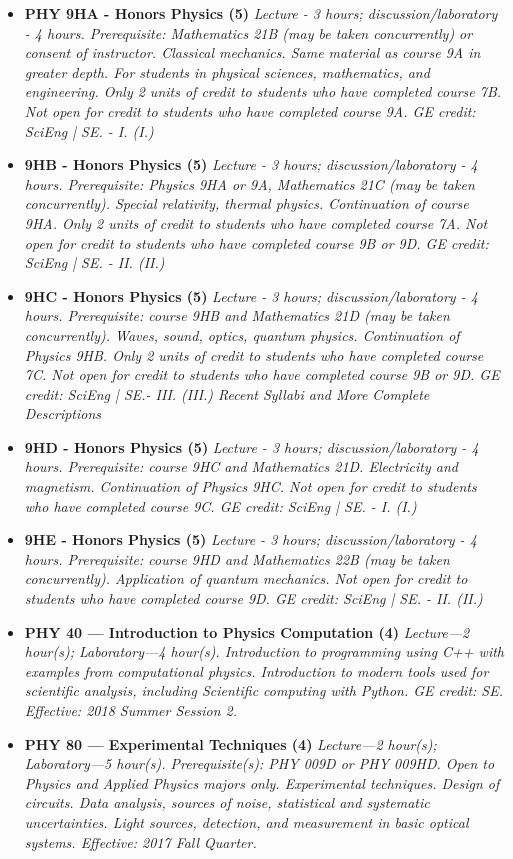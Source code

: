\documentclass[12pt]{article}
\begin{document}
\begin{itemize}
\item {\bf PHY 9HA - Honors Physics (5)}
{\it Lecture - 3 hours; discussion/laboratory - 4 hours. Prerequisite: Mathematics 21B (may be taken concurrently) or consent of instructor. Classical mechanics. Same material as course 9A in greater depth. For students in physical sciences, mathematics, and engineering. Only 2 units of credit to students who have completed course 7B. Not open for credit to students who have completed course 9A. GE credit: SciEng | SE. - I. (I.)}

\item {\bf 9HB - Honors Physics (5)}
{\it Lecture - 3 hours; discussion/laboratory - 4 hours. Prerequisite: Physics 9HA or 9A, Mathematics 21C (may be taken concurrently). Special relativity, thermal physics. Continuation of course 9HA. Only 2 units of credit to students who have completed course 7A. Not open for credit to students who have completed course 9B or 9D. GE credit: SciEng | SE. - II. (II.)}

\item {\bf 9HC - Honors Physics (5)}
{\it Lecture - 3 hours; discussion/laboratory - 4 hours. Prerequisite: course 9HB and Mathematics 21D (may be taken concurrently). Waves, sound, optics, quantum physics. Continuation of Physics 9HB. Only 2 units of credit to students who have completed course 7C. Not open for credit to students who have completed course 9B or 9D. GE credit: SciEng | SE.- III. (III.)
Recent Syllabi and More Complete Descriptions}

\item {\bf 9HD - Honors Physics (5)}
{\it Lecture - 3 hours; discussion/laboratory - 4 hours. Prerequisite: course 9HC and Mathematics 21D. Electricity and magnetism. Continuation of Physics 9HC. Not open for credit to students who have completed course 9C. GE credit: SciEng | SE. - I. (I.)}

\item {\bf 9HE - Honors Physics (5)}
{\it Lecture - 3 hours; discussion/laboratory - 4 hours. Prerequisite: course 9HD and Mathematics 22B (may be taken concurrently). Application of quantum mechanics. Not open for credit to students who have completed course 9D. GE credit: SciEng | SE. - II. (II.)}

\item {\bf PHY 40 — Introduction to Physics Computation (4)}
{\it Lecture—2 hour(s); Laboratory—4 hour(s). Introduction to programming using C++ with examples from computational physics. Introduction to modern tools used for scientific analysis, including Scientific computing with Python. GE credit: SE. Effective: 2018 Summer Session 2.}

\item {\bf PHY 80 — Experimental Techniques (4)}
{\it Lecture—2 hour(s); Laboratory—5 hour(s). Prerequisite(s): PHY 009D or PHY 009HD. Open to Physics and Applied Physics majors only. Experimental techniques. Design of circuits. Data analysis, sources of noise, statistical and systematic uncertainties. Light sources, detection, and measurement in basic optical systems. Effective: 2017 Fall Quarter.}

\end{itemize}
\end{document}
